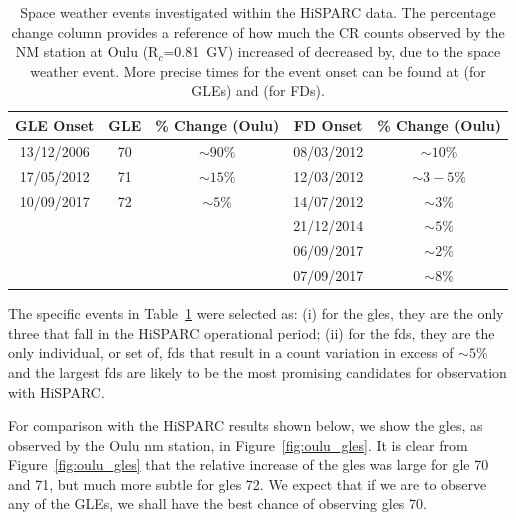 \begin{table}
	\begin{center}
		\caption{Space weather events investigated within the HiSPARC data. The percentage change column provides a reference of how much the CR counts observed by the NM station at Oulu (R$_c$=0.81~GV) increased of decreased by, due to the space weather event. More precise times for the event onset can be found at \citet{nmdb_nmdb_nodate} (for GLEs) and \citet{lingri_forbush_2016} (for FDs).}
		\label{tab:space_weather_events}
		\begin{tabular}{c c c | c c}
		\hline
		{\bf GLE Onset} & {\bf GLE} & {\bf \% Change (Oulu)} & {\bf FD Onset} & {\bf \% Change (Oulu)}\\
		\hline
		{13/12/2006} & {70} & {$\sim 90\%$} & {08/03/2012} & {$\sim 10\%$}  \\
		{17/05/2012} & {71} & {$\sim 15\%$} & {12/03/2012} & {$\sim 3-5\%$} \\
		{10/09/2017} & {72} & {$\sim 5\%$} & {14/07/2012} & {$\sim 3\%$} \\
		{} & {} & {} & {21/12/2014} & {$\sim 5\%$} \\
		{} & {} & {} & {06/09/2017} & {$\sim 2\%$} \\
		{} & {} & {} & {07/09/2017} & {$\sim 8\%$} \\
		\hline
		\end{tabular}
	\end{center}
\end{table}

The specific events in Table~\ref{tab:space_weather_events} were selected as: (i) for the \glspl{gle}, they are the only three that fall in the HiSPARC operational period; (ii) for the \glspl{fd}, they are the only individual, or set of, \glspl{fd} that result in a count variation in excess of $\sim 5\%$ and the largest \glspl{fd} are likely to be the most promising candidates for observation with HiSPARC.

For comparison with the HiSPARC results shown below, we show the \glspl{gle}, as observed by the Oulu \gls{nm} station, in Figure~\ref{fig:oulu_gles}. It is clear from Figure~\ref{fig:oulu_gles} that the relative increase of the \glspl{gle} was large for \gls{gle} 70 and 71, but much more subtle for \glspl{gle} 72. We expect that if we are to observe any of the GLEs, we shall have the best chance of observing \glspl{gle} 70. 

